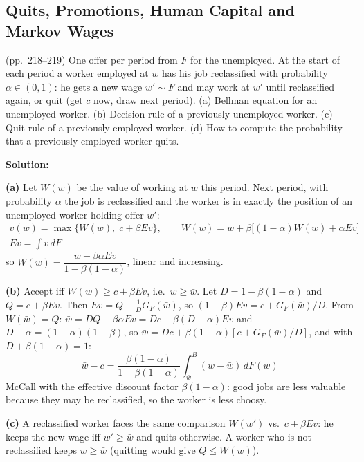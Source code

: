 \documentclass[12pt, letterpaper]{article}
\newcommand{\wb}{\bar w}
\begin{document}
\subsection{Quits, Promotions, Human Capital and Markov Wages}

\begin{tcolorbox}[evenbox,title={Exercise 6.22 \quad Quits}]
\begin{tcolorbox}[questionbox]
(pp.~218--219) One offer per period from $F$ for the unemployed. At the start of each period a worker
employed at $w$ has his job reclassified with probability $\alpha\in(0,1)$: he gets a new wage $w'\sim F$ and may
work at $w'$ until reclassified again, or quit (get $c$ now, draw next period). (a) Bellman equation for an
unemployed worker. (b) Decision rule of a previously unemployed worker. (c) Quit rule of a previously
employed worker. (d) How to compute the probability that a previously employed worker quits.
\end{tcolorbox}

\textbf{Solution:}

\textbf{(a)} Let $W(w)$ be the value of working at $w$ this period. Next period, with probability $\alpha$ the job is
reclassified and the worker is in exactly the position of an unemployed worker holding offer $w'$:
\[
\begin{gathered}\boxed{v(w)=\max\{W(w),\;c+\beta Ev\},\qquad W(w)=w+\beta\big[(1-\alpha)W(w)+\alpha Ev\big]}\\ Ev=\int v\,dF\end{gathered}
\]
so $W(w)=\dfrac{w+\beta\alpha Ev}{1-\beta(1-\alpha)}$, linear and increasing.

\textbf{(b)} Accept iff $W(w)\ge c+\beta Ev$, i.e.\ $w\ge\wb$. Let $D=1-\beta(1-\alpha)$ and $Q=c+\beta Ev$. Then
$Ev=Q+\frac{1}{D}G_F(\wb)$, so $(1-\beta)Ev=c+G_F(\wb)/D$. From $W(\wb)=Q$:
$\wb=DQ-\beta\alpha Ev=Dc+\beta(D-\alpha)Ev$ and $D-\alpha=(1-\alpha)(1-\beta)$, so
$\wb=Dc+\beta(1-\alpha)[c+G_F(\wb)/D]$, and with $D+\beta(1-\alpha)=1$:
\[
\boxed{\wb-c=\frac{\beta(1-\alpha)}{1-\beta(1-\alpha)}\int_{\wb}^B(w-\wb)\,dF(w)}
\]
McCall with the effective discount factor $\beta(1-\alpha)$: good jobs are less valuable because they may be
reclassified, so the worker is less choosy.

\textbf{(c)} A reclassified worker faces the same comparison $W(w')$ vs.\ $c+\beta Ev$: he keeps the new wage iff
$w'\ge\wb$ and quits otherwise. A worker who is not reclassified keeps $w\ge\wb$ (quitting would give
$Q\le W(w)$).


\end{tcolorbox}
\end{document}
